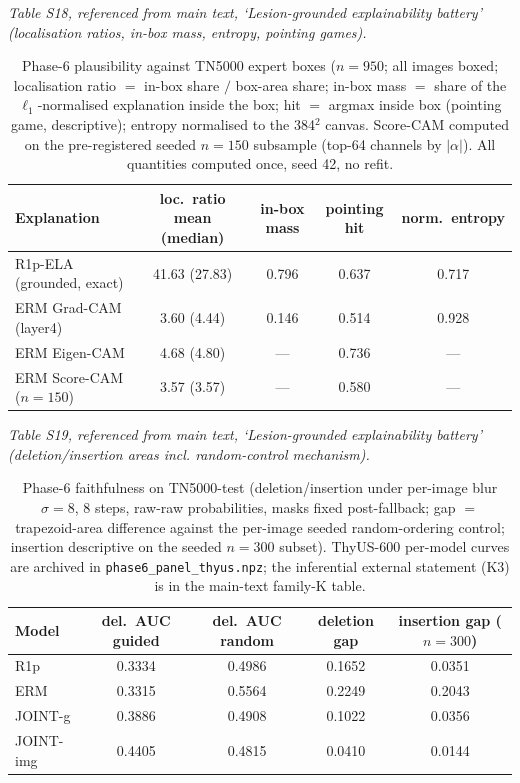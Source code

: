 \documentclass[11pt]{article}
\begin{document}
\noindent\emph{Table S18, referenced from main text, `Lesion-grounded explainability battery' (localisation ratios, in-box mass, entropy, pointing games).}

\begin{table}[!ht]
\centering\small
\caption{Phase-6 plausibility against TN5000 expert boxes ($n{=}950$;
all images boxed; localisation ratio $=$ in-box share $/$ box-area
share; in-box mass $=$ share of the $\ell_1$-normalised explanation
inside the box; hit $=$ argmax inside box (pointing game, descriptive);
entropy normalised to the 384$^2$ canvas. Score-CAM computed on the
pre-registered seeded $n{=}150$ subsample (top-64 channels by
$|\alpha|$). All quantities computed once, seed 42, no refit.}
\label{tab:phase6_plausibility}
\begin{tabular}{lcccc}
\toprule
Explanation & loc.\ ratio mean (median) & in-box mass & pointing hit & norm.\ entropy \\
\midrule
R1p-ELA (grounded, exact)      & 41.63 (27.83) & 0.796 & 0.637 & 0.717 \\
ERM Grad-CAM (layer4)          & 3.60 (4.44)   & 0.146 & 0.514 & 0.928 \\
ERM Eigen-CAM                  & 4.68 (4.80)   & ---   & 0.736 & ---   \\
ERM Score-CAM ($n{=}150$)      & 3.57 (3.57)   & ---   & 0.580 & ---   \\
\bottomrule
\end{tabular}
\end{table}

\noindent\emph{Table S19, referenced from main text, `Lesion-grounded explainability battery' (deletion/insertion areas incl. random-control mechanism).}

\begin{table}[!ht]
\centering\small
\caption{Phase-6 faithfulness on TN5000-test (deletion/insertion under
per-image blur $\sigma{=}8$, 8 steps, raw-raw probabilities, masks fixed
post-fallback; gap $=$ trapezoid-area difference against the per-image
seeded random-ordering control; insertion descriptive on the seeded
$n{=}300$ subset). ThyUS-600 per-model curves are archived in
\texttt{phase6\_panel\_thyus.npz}; the inferential external statement
(K3) is in the main-text family-K table.}
\label{tab:phase6_faithfulness}
\begin{tabular}{lcccc}
\toprule
Model & del.\ AUC guided & del.\ AUC random & deletion gap & insertion gap ($n{=}300$) \\
\midrule
R1p       & 0.3334 & 0.4986 & 0.1652 & 0.0351 \\
ERM       & 0.3315 & 0.5564 & 0.2249 & 0.2043 \\
JOINT-g   & 0.3886 & 0.4908 & 0.1022 & 0.0356 \\
JOINT-img & 0.4405 & 0.4815 & 0.0410 & 0.0144 \\
\bottomrule
\end{tabular}
\end{table}
\end{document}
